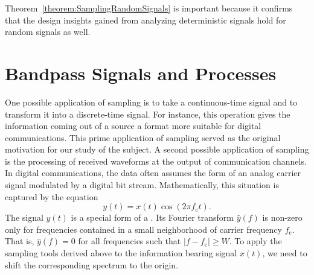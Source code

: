 Theorem~\ref{theorem:SamplingRandomSignals} is important because it confirms that the design insights gained from analyzing deterministic signals hold for random signals as well.


\section{Bandpass Signals and Processes}

One possible application of sampling is to take a continuous-time signal and to transform it into a discrete-time signal.
For instance, this operation gives the information coming out of a source a format more suitable for digital communications.
This prime application of sampling served as the original motivation for our study of the subject.
A second possible application of sampling is the processing of received waveforms at the output of communication channels.
In digital communications, the data often assumes the form of an analog carrier signal modulated by a digital bit stream.
Mathematically, this situation is captured by the equation
\begin{equation*}
y(t) = x(t) \cos (2 \pi f_{\mathrm{c}} t) .
\end{equation*}
The signal $y(t)$ is a special form of a .
Its Fourier transform $\hat{y}(f)$ is non-zero only for frequencies contained in a small neighborhood of carrier frequency $f_{\mathrm{c}}$.
That is, $\hat{y}(f) = 0$ for all frequencies such that $|f - f_{\mathrm{c}}| \geq W$.
To apply the sampling tools derived above to the information bearing signal $x(t)$, we need to shift the corresponding spectrum to the origin.

